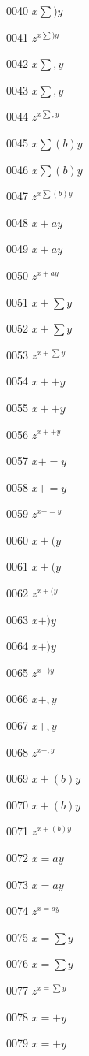 \documentclass{article}
\begin{document}
0040 $x\sum )y$\par
0041 $z^{x\sum )y}$\par
0042 $\displaystyle x\sum ,y$\par
0043 $x\sum ,y$\par
0044 $z^{x\sum ,y}$\par
0045 $\displaystyle x\sum \left(b\right) y$\par
0046 $x\sum \left(b\right) y$\par
0047 $z^{x\sum \left(b\right) y}$\par
0048 $\displaystyle x+ay$\par
0049 $x+ay$\par
0050 $z^{x+ay}$\par
0051 $\displaystyle x+\sum y$\par
0052 $x+\sum y$\par
0053 $z^{x+\sum y}$\par
0054 $\displaystyle x++y$\par
0055 $x++y$\par
0056 $z^{x++y}$\par
0057 $\displaystyle x+=y$\par
0058 $x+=y$\par
0059 $z^{x+=y}$\par
0060 $\displaystyle x+(y$\par
0061 $x+(y$\par
0062 $z^{x+(y}$\par
0063 $\displaystyle x+)y$\par
0064 $x+)y$\par
0065 $z^{x+)y}$\par
0066 $\displaystyle x+,y$\par
0067 $x+,y$\par
0068 $z^{x+,y}$\par
0069 $\displaystyle x+\left(b\right) y$\par
0070 $x+\left(b\right) y$\par
0071 $z^{x+\left(b\right) y}$\par
0072 $\displaystyle x=ay$\par
0073 $x=ay$\par
0074 $z^{x=ay}$\par
0075 $\displaystyle x=\sum y$\par
0076 $x=\sum y$\par
0077 $z^{x=\sum y}$\par
0078 $\displaystyle x=+y$\par
0079 $x=+y$\par
\end{document}
